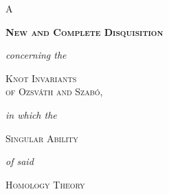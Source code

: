 
\begin{titlepage}
    \centering
    \thispagestyle{empty}

    \setlength{\parskip}{0pt}
    \singlespacing

    \selectfont

    \vspace*{\fill}

    {\Huge \scshape A}

    \vspace{0.55cm}

    {\Huge \bfseries \scshape New and Complete Disquisition}

    \vspace{0.45cm}

    {\Large \itshape concerning the}

    \vspace{0.45cm}

    {\Huge \scshape Knot Invariants\\[0.15em] of Ozsv\'{a}th and Szab\'{o},}

    \vspace{0.45cm}

    {\Large \itshape in which the}

    \vspace{0.45cm}

    {\LARGE \scshape Singular Ability}

    \vspace{0.3cm}

    {\Large \itshape of said}

    \vspace{0.3cm}

    {\LARGE \scshape Homology Theory}


\end{titlepage}
